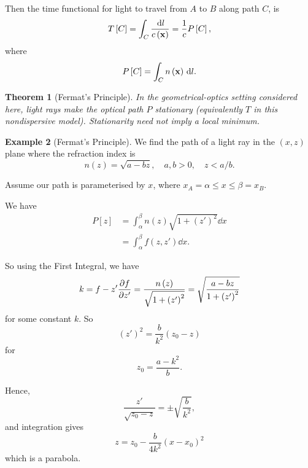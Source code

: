 \documentclass[11pt]{article}
\numberwithin{equation}{section}
\newtheorem{theorem}{Theorem}[section]
\theoremstyle{definition}
\newtheorem{example}[theorem]{Example}
\theoremstyle{remark}
\newcommand{\pqty}[1]{\left(#1\right)}
\newcommand{\bqty}[1]{\left[#1\right]}
\begin{document}
Then the time functional for light to travel from \(A\) to \(B\) along path \(C\), is
\[
    T\bqty{C} = \int_{C} \frac{\dd{l}}{c\pqty{\vb{x}}} = \frac{1}{c} P\bqty{C},
\]
where
\[
    P\bqty{C} = \int_{C} n\pqty{\vb{x}} \dd{l}.
\]

\begin{theorem}[Fermat's Principle]\label{variation-unit-0047}
    In the geometrical-optics setting considered here, light rays make the optical path \(P\) stationary (equivalently \(T\) in this nondispersive model). Stationarity need not imply a local minimum.
\end{theorem}

\begin{example}[Fermat's Principle]\label{variation-unit-0048}
    We find the path of a light ray in the \(\pqty{x, z}\) plane where the refraction index is
    \[
        n\pqty{z} = \sqrt{a-bz},\quad a,b>0,\quad z<a/b.
    \]

    Assume our path is parameterised by \(x\), where \(x_A = \alpha \leq x \leq \beta = x_B\).

    We have
    \begin{align*}
        P\bqty{z} &= \int_{\alpha}^{\beta} n\pqty{z} \sqrt{1 + \pqty{z'}^2} \dd{x} \\
        &= \int_{\alpha}^{\beta} f\pqty{z, z'} \dd{x}.
    \end{align*}

    So using the First Integral, we have
    \[
        k = f - z' \pdv{f}{z'} = \frac{n\pqty{z}}{\sqrt{1 + \pqty{z'}^2}} = \sqrt{\frac{a - bz}{1 + \pqty{z'}^2}}
    \]
    for some constant \(k\). So
    \[
        \pqty{z'}^2 = \frac{b}{k^2} \pqty{z_0 - z}
    \]
    for
    \[
        z_0 = \frac{a - k^2}{b}.
    \]

    Hence,
    \[
        \frac{z'}{\sqrt{z_0 - z}} = \pm \sqrt{\frac{b}{k^2}},
    \]
    and integration gives
    \[
        z = z_0 - \frac{b}{4k^2} \pqty{x - x_0}^2
    \]
    which is a parabola.
\end{example}
\end{document}
